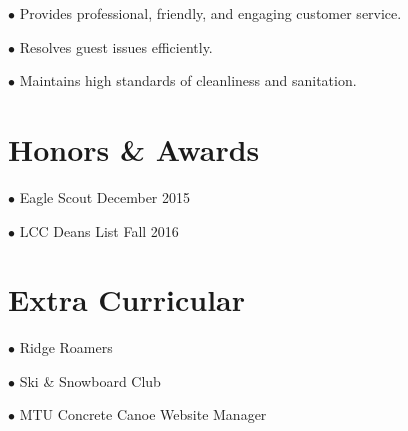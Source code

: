 \documentclass{article}
\begin{document}
$\bullet$ Provides professional, friendly, and engaging customer service.

$\bullet$ Resolves guest issues efficiently.

$\bullet$ Maintains high standards of cleanliness and sanitation.



\section{Honors \& Awards}

$\bullet$ Eagle Scout \hfill December 2015

$\bullet$ LCC Deans List \hfill Fall 2016


\section{Extra Curricular}

$\bullet$ Ridge Roamers

$\bullet$ Ski \& Snowboard Club

$\bullet$ MTU Concrete Canoe Website Manager
\end{document}
